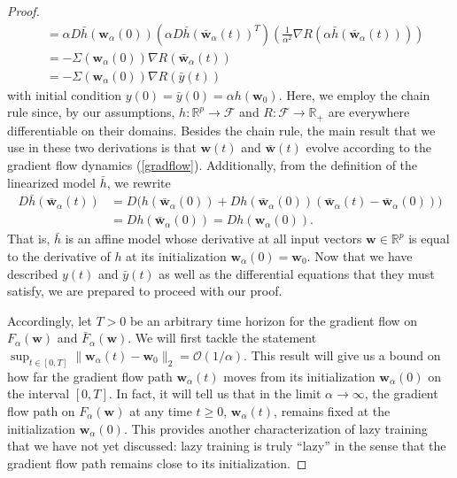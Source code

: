 \documentclass{article}
\begin{document}
\begin{proof}
\begin{align*}
    &= \alpha D\bar{h}(\boldsymbol{w}_{\alpha}(0)) \left( \alpha D\bar{h}(\boldsymbol{\bar{w}}_{\alpha}(t))^T \right)\left( \frac{1}{\alpha^2} \nabla R(\alpha \bar{h}(\boldsymbol{\bar{w}}_{\alpha}(t))) \right)\\
    &= -\Sigma(\boldsymbol{w}_{\alpha}(0))\nabla R(\boldsymbol{\bar{w}}_{\alpha}(t))\\
    &= -\Sigma(\boldsymbol{w}_{\alpha}(0))\nabla R(\bar{y}(t))
\end{align*}
with initial condition $y(0) = \bar{y}(0) = \alpha h(\boldsymbol{w}_0)$. Here, we employ the chain rule since, by our assumptions, $h: \mathbb{R}^p \rightarrow \mathcal{F}$ and $R: \mathcal{F} \rightarrow \mathbb{R}_+$ are everywhere differentiable on their domains. Besides the chain rule, the main result that we use in these two derivations is that $\boldsymbol{w}(t)$ and $\boldsymbol{\bar{w}}(t)$ evolve according to the gradient flow dynamics (\ref{gradflow}). Additionally, from the definition of the linearized model $\bar{h}$, we rewrite
\begin{align*}
  D\bar{h}(\boldsymbol{\bar{w}}_{\alpha}(t)) &= D\bigg( h(\boldsymbol{\bar{w}}_{\alpha}(0)) + Dh(\boldsymbol{\bar{w}}_{\alpha}(0))(\boldsymbol{\bar{w}}_{\alpha}(t) - \boldsymbol{\bar{w}}_{\alpha}(0))  \bigg)\\
  &= Dh(\boldsymbol{\bar{w}}_{\alpha}(0)) = Dh(\boldsymbol{w}_{\alpha}(0)).
\end{align*}
That is, $\bar{h}$ is an affine model whose derivative at all input vectors $\boldsymbol{w} \in \mathbb{R}^p$ is equal to the derivative of $h$ at its initialization $\boldsymbol{w}_{\alpha}(0) = \boldsymbol{w}_0$. Now that we have described $y(t)$ and $\bar{y}(t)$ as well as the differential equations that they must satisfy, we are prepared to proceed with our proof.

Accordingly, let $T > 0$ be an arbitrary time horizon for the gradient flow on $F_{\alpha}(\boldsymbol{w})$ and $\bar{F}_{\alpha}(\boldsymbol{w})$. We will first tackle the statement $\sup_{t \in [0, T]} \|\boldsymbol{w}_{\alpha}(t) - \boldsymbol{w}_0 \|_2 = \mathcal{O}(1/\alpha)$. This result will give us a bound on how far the gradient flow path $\boldsymbol{w}_{\alpha}(t)$ moves from its initialization $\boldsymbol{w}_{\alpha}(0)$ on the interval $[0, T]$. In fact, it will tell us that in the limit $\alpha \rightarrow \infty$, the gradient flow path on $F_{\alpha}(\boldsymbol{w})$ at any time $t \geq 0$, $\boldsymbol{w}_{\alpha}(t)$, remains fixed at the initialization $\boldsymbol{w}_{\alpha}(0)$. This provides another characterization of lazy training that we have not yet discussed: lazy training is truly \enquote{lazy} in the sense that the gradient flow path remains close to its initialization.


\end{proof}
\end{document}
